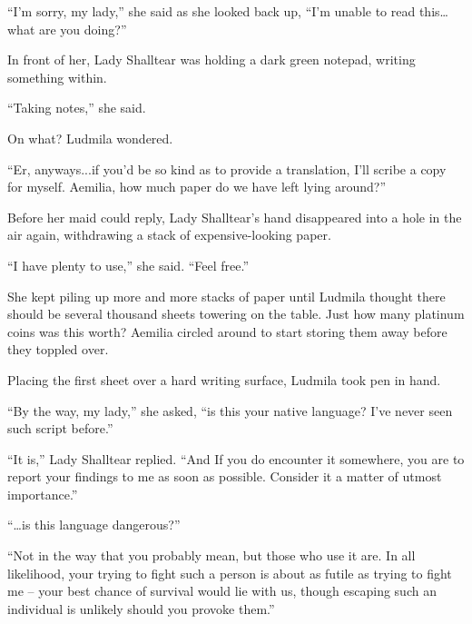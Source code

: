  

“I’m sorry, my lady,” she said as she looked back up, “I’m unable to read this…what are you doing?”

 

In front of her, Lady Shalltear was holding a dark green notepad, writing something within.

 

“Taking notes,” she said.

 

On what? Ludmila wondered.

 

“Er, anyways...if you’d be so kind as to provide a translation, I’ll scribe a copy for myself. Aemilia, how much paper do we have left lying around?”

 

Before her maid could reply, Lady Shalltear’s hand disappeared into a hole in the air again, withdrawing a stack of expensive-looking paper.

 

“I have plenty to use,” she said. “Feel free.”

 

She kept piling up more and more stacks of paper until Ludmila thought there should be several thousand sheets towering on the table. Just how many platinum coins was this worth? Aemilia circled around to start storing them away before they toppled over.

 

Placing the first sheet over a hard writing surface, Ludmila took pen in hand.

 

“By the way, my lady,” she asked, “is this your native language? I’ve never seen such script before.”

 

“It is,” Lady Shalltear replied. “And If you do encounter it somewhere, you are to report your findings to me as soon as possible. Consider it a matter of utmost importance.”

 

“…is this language dangerous?”

 

“Not in the way that you probably mean, but those who use it are. In all likelihood, your trying to fight such a person is about as futile as trying to fight me – your best chance of survival would lie with us, though escaping such an individual is unlikely should you provoke them.”

